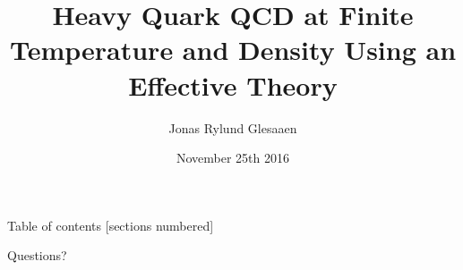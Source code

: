 \documentclass[12pt]{beamer}
\author{Jonas Rylund Glesaaen}
\title{Heavy Quark QCD at Finite Temperature and Density Using an Effective Theory}
\institute{Goethe University Frankfurt}
\date{November 25th 2016}
\begin{document}
\maketitle

\begin{frame}{Table of contents}
  [sections numbered]
  \tableofcontents[hideallsubsections]
\end{frame}






\begin{frame}[standout]
  Questions?
\end{frame}


\end{document}
